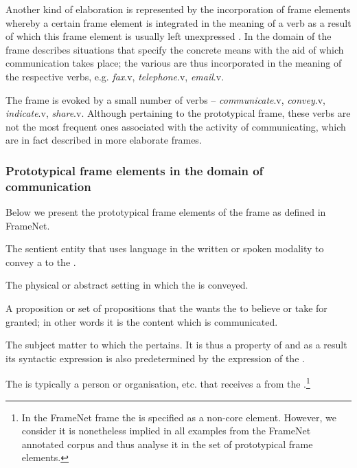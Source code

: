 \documentclass[output=paper,colorlinks,citecolor=brown]{langscibook}
\begin{document}
Another kind of elaboration is represented by the incorporation of frame elements \citep[164--165]{Jackendoff1990} whereby a certain frame element is integrated in the meaning of a verb as a result of which this frame element is usually left unexpressed \citep[30]{Ruppenhofer2016}. In the domain of  the frame  describes situations that specify the concrete means with the aid of which communication takes place; the various  are thus incorporated in the meaning of the respective verbs, e.g. \textit{fax}.v, \textit{telephone}.v, \textit{email}.v.

The frame  is evoked by a small number of verbs -- \textit{communicate}.v, \textit{convey}.v, \textit{indicate}.v, \textit{share}.v. Although pertaining to the prototypical frame, these verbs are not the most frequent ones associated with the activity of communicating, which are in fact described in more elaborate frames.  


\subsubsection{Prototypical frame elements in the domain of communication}

Below we present the prototypical frame elements of the  frame as defined in FrameNet.

\begin{description}[font=\normalfont]\sloppy
\item[\fename{Communicator} (Semantic type: Sentient)] The sentient entity that uses language in the written or spoken modality to convey a  to the . 
\item[\fename{Medium}] The physical or abstract setting in which the  is conveyed.
\item[\fename{Message} (Semantic type: Message)] A proposition or set of propositions that the  wants the  to believe or take for granted; in other words it is the content which is communicated. 
\item[\fename{Topic}]  The subject matter to which the  pertains.  It is thus a property of  \citep[17]{Johnson2001} and as a result its syntactic expression is also predetermined by the expression of the .
\item[\fename{Addressee} (Semantic type: Sentient)]  The  is typically a person or organisation, etc. that receives a  from the .\footnote{In the FrameNet frame  the  is specified as a non-core element. However, we consider it is nonetheless implied in all examples from the FrameNet annotated corpus and thus analyse it in the set of prototypical frame elements.}
\end{description}
\end{document}

